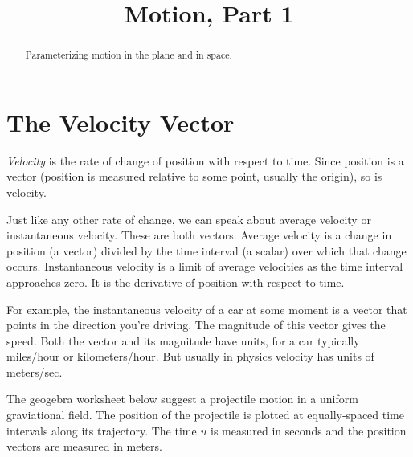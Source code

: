 \documentclass{ximera}
\title{Motion, Part 1}
\begin{document}
\begin{abstract}
Parameterizing motion in the plane and in space. 
\end{abstract}
\maketitle


\section{The Velocity Vector}

\begin{exploration}
\emph{Velocity} is the rate of change of position with respect to time. Since position is a vector (position is measured relative to some point, usually the origin), so is velocity. 

Just like any other rate of change, we can speak about average velocity or instantaneous velocity. These are both vectors. Average velocity is a change in position (a vector) divided by the time interval (a scalar) over which that change occurs. Instantaneous velocity is a limit of average velocities as the time interval approaches zero. It is the derivative of position with respect to time.

For example, the instantaneous velocity of a car at some moment is a vector that points in the direction you're driving. The magnitude of this vector gives the speed. Both the vector and its magnitude have units, for a car typically miles/hour or kilometers/hour. But usually in physics velocity has units of meters/sec.
 




The geogebra worksheet below suggest a projectile motion in a uniform graviational field. The position of the projectile is plotted at equally-spaced time intervals along its trajectory. The time $u$ is measured in seconds and the position vectors are measured in meters.


\end{exploration}
\end{document}
